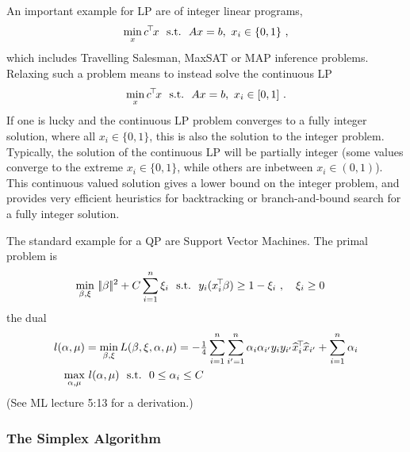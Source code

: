 An important example for LP are  of integer linear
programs,
 \begin{equation}
\min_x c^{\!\top\!} x ~~\text{s.t.}~~ Ax=b,~ x_i \in\{0,1\} ~,
\end{equation}
which includes Travelling Salesman, MaxSAT or MAP inference problems. Relaxing such
a problem means to instead solve the continuous LP
\begin{equation}
\min_x c^{\!\top\!} x ~~\text{s.t.}~~ Ax=b,~ x_i\in[0,1] ~.
\end{equation}
If one is lucky and the
continuous LP problem converges to a fully integer solution, where all
$x_i \in \{0,1\}$, this is also the solution to the integer
problem. Typically, the solution of the continuous LP will be
partially integer (some values converge to the extreme
$x_i \in \{0,1\}$, while others are inbetween $x_i \in (0,1)$). This
continuous valued solution gives a lower bound on the integer problem,
and provides very efficient heuristics for backtracking or
branch-and-bound search for a fully integer solution.

The standard example for a QP are Support Vector Machines. The primal
problem is
\begin{align}
\min_{\beta,\xi}
&~ |\!|\beta|\!|^2 + C \sum_{i=1}^n \xi_i ~~\text{s.t.}~~ y_i (x_i^{\!\top\!} \beta) \ge
1-\xi_i~,\quad \xi_i\ge 0
\end{align}
the dual
\begin{align}
l(\alpha,\mu)
&= \min_{\beta,\xi} L(\beta,\xi,\alpha,\mu)
 = -{\textstyle\frac{1}{4}} \sum_{i=1}^n \sum_{i'=1}^n \alpha_i \alpha_{i'}
 y_i y_{i'} \widehat x_i^{\!\top\!} \widehat x_{i'} + \sum_{i=1}^n \alpha_i \\
\max_{\alpha,\mu}
&~ l(\alpha,\mu) ~~\text{s.t.}~~ 0 \le \alpha_i \le C
\end{align}
(See ML lecture 5:13 for a derivation.)


\subsubsection{The Simplex Algorithm}

